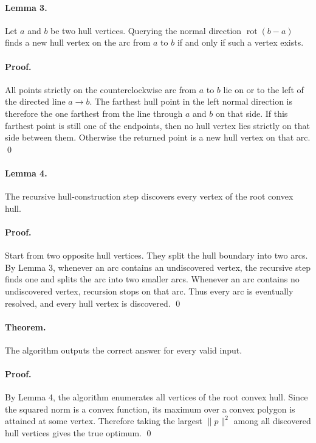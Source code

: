 \documentclass[11pt]{article}
\begin{document}
\paragraph{Lemma 3.}
Let $a$ and $b$ be two hull vertices. Querying the normal direction $\operatorname{rot}(b-a)$ finds a
new hull vertex on the arc from $a$ to $b$ if and only if such a vertex exists.

\paragraph{Proof.}
All points strictly on the counterclockwise arc from $a$ to $b$ lie on or to the left of the directed line
$a \to b$. The farthest hull point in the left normal direction is therefore the one farthest from the line
through $a$ and $b$ on that side. If this farthest point is still one of the endpoints, then no hull vertex
lies strictly on that side between them. Otherwise the returned point is a new hull vertex on that arc. \qed

\paragraph{Lemma 4.}
The recursive hull-construction step discovers every vertex of the root convex hull.

\paragraph{Proof.}
Start from two opposite hull vertices. They split the hull boundary into two arcs. By Lemma 3, whenever
an arc contains an undiscovered vertex, the recursive step finds one and splits the arc into two smaller
arcs. Whenever an arc contains no undiscovered vertex, recursion stops on that arc. Thus every arc is
eventually resolved, and every hull vertex is discovered. \qed

\paragraph{Theorem.}
The algorithm outputs the correct answer for every valid input.

\paragraph{Proof.}
By Lemma 4, the algorithm enumerates all vertices of the root convex hull. Since the squared norm is a
convex function, its maximum over a convex polygon is attained at some vertex. Therefore taking the
largest $\|p\|^2$ among all discovered hull vertices gives the true optimum. \qed
\end{document}
